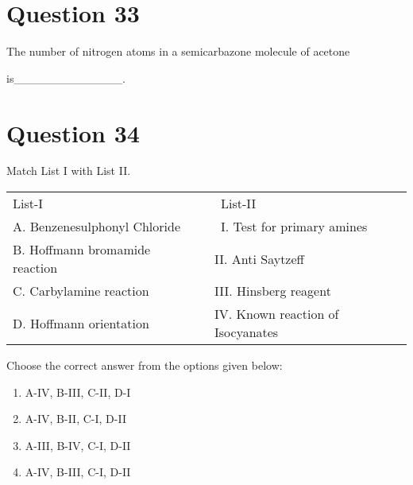 \documentclass{article}
\begin{document}
\section*{Question 33}
The number of nitrogen atoms in a semicarbazone molecule of acetone

is\_\_\_\_\_\_\_\_\_\_\_\_\_.


\begin{enumerate}[label=(\alph*)]
\end{enumerate}
\newpage
\section*{Question 34}
Match List I with List II.



\begin{longtable}[]{@{}ll@{}}

\toprule\noalign{}

\endhead

\bottomrule\noalign{}

\endlastfoot

List-I~~ & ~List-II~ \\

A. Benzenesulphonyl Chloride & ~I. Test for primary amines~ \\

B. Hoffmann bromamide reaction~~ & II. Anti Saytzeff~~ \\

C. Carbylamine reaction~ & III. Hinsberg reagent~ \\

D. Hoffmann orientation~ & IV. Known reaction of Isocyanates~ \\

\end{longtable}



Choose the correct answer from the options given below:\\


\begin{enumerate}[label=(\alph*)]
\item A-IV, B-III, C-II, D-I


\item A-IV, B-II, C-I, D-II


\item A-III, B-IV, C-I, D-II


\item A-IV, B-III, C-I, D-II


\end{enumerate}
\newpage
\end{document}
